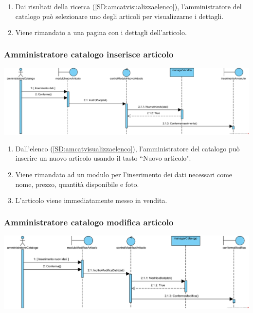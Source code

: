 \documentclass[12pt,a4paper]{article}
\begin{document}
\begin{enumerate}
\item Dai risultati della ricerca (\ref{SD:amcatvisualizzaelenco}), l'amministratore del catalogo può selezionare uno degli articoli per visualizzarne i dettagli.
\item Viene rimandato a una pagina con i dettagli dell'articolo.
\end{enumerate}

\subsubsection{Amministratore catalogo inserisce articolo}
\label{SD:amcatinseriscearticolo}
\begin{center}
\includegraphics[width=\textwidth]{SequenceDiagram/AmministratoreCatalogoVenditaCrea}
\end{center}

\begin{enumerate}
\item Dall'elenco (\ref{SD:amcatvisualizzaelenco}), l'amministratore del catalogo può inserire un nuovo articolo usando il tasto ``Nuovo articolo".
\item Viene rimandato ad un modulo per l'inserimento dei dati necessari come nome, prezzo, quantità disponibile e foto.
\item L'articolo viene immediatamente messo in vendita.
\end{enumerate}

\subsubsection{Amministratore catalogo modifica articolo}
\label{SD:amcatmodificaarticolo}
\begin{center}
\includegraphics[width=\textwidth]{SequenceDiagram/AmministratoreCatalogoVenditaModifica}
\end{center}
\end{document}
